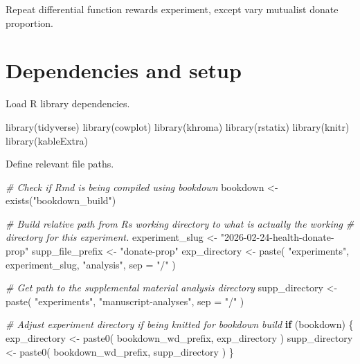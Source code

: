 \documentclass[
]{book}
\newenvironment{Shaded}{\begin{snugshade}}{\end{snugshade}}
\newcommand{\AttributeTok}[1]{\textcolor[rgb]{0.77,0.63,0.00}{#1}}
\newcommand{\CommentTok}[1]{\textcolor[rgb]{0.56,0.35,0.01}{\textit{#1}}}
\newcommand{\ControlFlowTok}[1]{\textcolor[rgb]{0.13,0.29,0.53}{\textbf{#1}}}
\newcommand{\FunctionTok}[1]{\textcolor[rgb]{0.00,0.00,0.00}{#1}}
\newcommand{\NormalTok}[1]{#1}
\newcommand{\OtherTok}[1]{\textcolor[rgb]{0.56,0.35,0.01}{#1}}
\newcommand{\StringTok}[1]{\textcolor[rgb]{0.31,0.60,0.02}{#1}}
\begin{document}
Repeat differential function rewards experiment, except vary mutualist donate proportion.

\hypertarget{dependencies-and-setup-3}{%
\section{Dependencies and setup}\label{dependencies-and-setup-3}}

Load R library dependencies.

\begin{Shaded}
\begin{Highlighting}[]
\FunctionTok{library}\NormalTok{(tidyverse)}
\FunctionTok{library}\NormalTok{(cowplot)}
\FunctionTok{library}\NormalTok{(khroma)}
\FunctionTok{library}\NormalTok{(rstatix)}
\FunctionTok{library}\NormalTok{(knitr)}
\FunctionTok{library}\NormalTok{(kableExtra)}
\end{Highlighting}
\end{Shaded}

Define relevant file paths.

\begin{Shaded}
\begin{Highlighting}[]
\CommentTok{\# Check if Rmd is being compiled using bookdown}
\NormalTok{bookdown }\OtherTok{\textless{}{-}} \FunctionTok{exists}\NormalTok{(}\StringTok{"bookdown\_build"}\NormalTok{)}

\CommentTok{\# Build relative path from R\textquotesingle{}s working directory to what is actually the working}
\CommentTok{\# directory for this experiment.}
\NormalTok{experiment\_slug }\OtherTok{\textless{}{-}} \StringTok{"2026{-}02{-}24{-}health{-}donate{-}prop"}
\NormalTok{supp\_file\_prefix }\OtherTok{\textless{}{-}} \StringTok{"donate{-}prop"}
\NormalTok{exp\_directory }\OtherTok{\textless{}{-}} \FunctionTok{paste}\NormalTok{(}
  \StringTok{"experiments"}\NormalTok{,}
\NormalTok{  experiment\_slug,}
  \StringTok{"analysis"}\NormalTok{,}
  \AttributeTok{sep =} \StringTok{"/"}
\NormalTok{)}

\CommentTok{\# Get path to the supplemental material analysis directory}
\NormalTok{supp\_directory }\OtherTok{\textless{}{-}} \FunctionTok{paste}\NormalTok{(}
  \StringTok{"experiments"}\NormalTok{,}
  \StringTok{"manuscript{-}analyses"}\NormalTok{,}
  \AttributeTok{sep =} \StringTok{"/"}
\NormalTok{)}

\CommentTok{\# Adjust experiment directory if being knitted for bookdown build}
\ControlFlowTok{if}\NormalTok{ (bookdown) \{}
\NormalTok{  exp\_directory }\OtherTok{\textless{}{-}} \FunctionTok{paste0}\NormalTok{(}
\NormalTok{    bookdown\_wd\_prefix,}
\NormalTok{    exp\_directory}
\NormalTok{  )}
\NormalTok{  supp\_directory }\OtherTok{\textless{}{-}} \FunctionTok{paste0}\NormalTok{(}
\NormalTok{    bookdown\_wd\_prefix,}
\NormalTok{    supp\_directory}
\NormalTok{  )}
\NormalTok{\}}
\end{Highlighting}
\end{Shaded}
\end{document}

